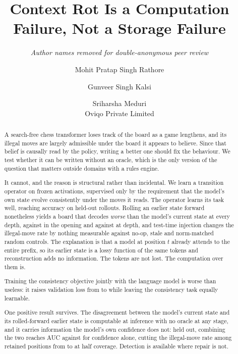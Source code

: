 \documentclass[11pt]{article}
\title{\bf Context Rot Is a Computation Failure, Not a Storage Failure}
\author{\normalsize\itshape Author names removed for double-anonymous peer review}
\author{Mohit Pratap Singh Rathore \and Gunveer Singh Kalsi \and Sriharsha Meduri\\
  \small Oviqo Private Limited}
\date{}
\begin{document}
\maketitle

\begin{abstract}
A search-free chess transformer loses track of the board as a game lengthens, and
its illegal moves are largely admissible under the board it appears to believe.
Since that belief is causally read by the policy, writing a better one should fix
the behaviour. We test whether it can be written without an oracle, which is the
only version of the question that matters outside domains with a rules engine.

It cannot, and the reason is structural rather than incidental. We learn a
transition operator on frozen activations, supervised only by the requirement
that the model's own state evolve consistently under the moves it reads. The
operator learns its task well, reaching  accuracy on held-out
rollouts. Rolling an earlier state forward nonetheless yields a board that
decodes \emph{worse} than the model's current state at every depth,
 against  in the opening
and  against  at depth, and
test-time injection changes the illegal-move rate by nothing measurable against
no-op, stale and norm-matched random controls. The explanation is that a model at
position $t$ already attends to the entire prefix, so its earlier state is a
lossy function of the same tokens and reconstruction adds no information. The
tokens are not lost. The computation over them is.

Training the consistency objective jointly with the language model is worse than
useless: it raises validation loss from  to
 while leaving the consistency task equally learnable.

One positive result survives. The disagreement between the model's current state
and its rolled-forward earlier state is computable at inference with no oracle at
any stage, and it carries information the model's own confidence does not: held
out, combining the two reaches AUC  against
 for confidence alone, cutting the illegal-move rate among
retained positions from  to  at half
coverage. Detection is available where repair is not.
\end{abstract}
\end{document}
